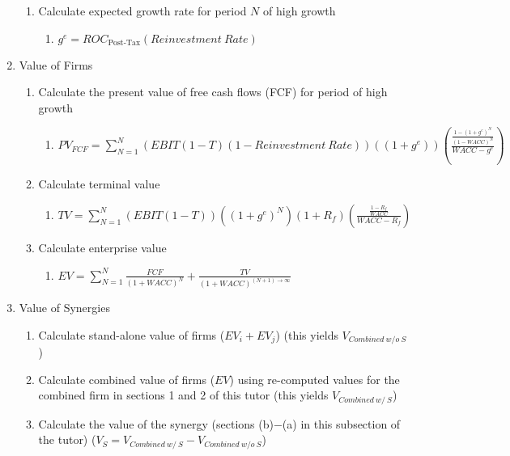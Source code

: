 \documentclass[11pt, english]{article}
\begin{document}
\begin{enumerate}
\begin{enumerate}
                        \item Calculate expected growth rate for period $N$ of high growth
                        \begin{enumerate}
                                \item $g^e=ROC_{\textrm{Post-Tax}}(Reinvestment\ Rate)$
                        \end{enumerate}
                \end{enumerate}
                \item Value of Firms
                \begin{enumerate}
                        \item Calculate the present value of free cash flows (FCF) for period of high growth 
                        \begin{enumerate}
                                \item $PV_{FCF}=\sum_{N=1}^N(EBIT(1-T)(1-Reinvestment\ Rate))((1+g^e))\left(\frac{\frac{1-(1+g^e)^N}{(1-WACC)^N}}{WACC-g^e}\right)$
                        \end{enumerate}
                        \item Calculate terminal value
                        \begin{enumerate}
                                \item $TV=\sum_{N=1}^N(EBIT(1-T))((1+g^e)^N)(1+R_f)\left(\frac{\frac{1-R_f}{WACC}}{WACC-R_f}\right)$
                        \end{enumerate}
                        \item Calculate enterprise value
                        \begin{enumerate}
                                \item $EV=\sum_{N=1}^N\frac{FCF}{(1+WACC)^N}+\frac{TV}{(1+WACC)^{(N+1)\longrightarrow\infty}}$
                        \end{enumerate}
                \end{enumerate}
                \item Value of Synergies
                \begin{enumerate}
                        \item Calculate stand-alone value of firms ($EV_i+EV_j$) (this yields $V_{Combined\ w/o\ S}$)
                        \item Calculate combined value of firms ($EV$) using re-computed values for the combined firm in sections 1 and 2 of this tutor (this yields $V_{Combined\ w/\ S}$)
                        \item Calculate the value of the synergy (sections (b)$-$(a) in this subsection of the tutor) ($V_S=V_{Combined\ w/\ S}-V_{Combined\ w/o\ S}$)
                \end{enumerate}
	\end{enumerate}
\end{document}
